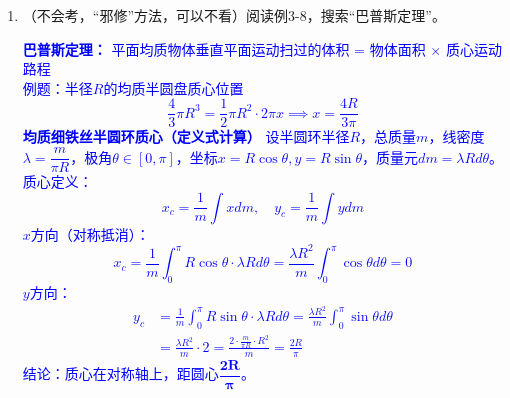 \documentclass[12pt,a4paper]{article}
\begin{document}
\begin{enumerate}[label=\arabic*.,leftmargin=*]
    \colorbox{yellow}{式3-25两端对时间微分得到质心加速度与质心外力的关系；积分得到什么？}

    \textcolor{blue}{积分会得到一维的质心坐标的式子}

    \textcolor{blue}{质心式子的推广，关键是看里面那个物理量是相对于谁而言的，有时可以得出“相对质心的质心运动速度”，即为0}
    \item （不会考，“邪修”方法，可以不看）阅读例3-8，搜索“巴普斯定理”。
    
    \textcolor{blue}{\textbf{巴普斯定理：} 平面均质物体垂直平面运动扫过的体积 = 物体面积 × 质心运动路程
\\例题：半径$R$的均质半圆盘质心位置
\[
\frac{4}{3}\pi R^3 = \frac{1}{2}\pi R^2 \cdot 2\pi x
\implies x = \frac{4R}{3\pi}
\]
\textbf{均质细铁丝半圆环质心（定义式计算）}
设半圆环半径$R$，总质量$m$，线密度$\lambda = \dfrac{m}{\pi R}$，极角$\theta\in[0,\pi]$，坐标$x=R\cos\theta,y=R\sin\theta$，质量元$dm=\lambda R d\theta$。
质心定义：
\[
x_c = \frac{1}{m}\int x dm, \quad y_c = \frac{1}{m}\int y dm
\]
$x$方向（对称抵消）：
\[
x_c = \frac{1}{m}\int_0^\pi R\cos\theta·\lambda R d\theta = \frac{\lambda R^2}{m}\int_0^\pi \cos\theta d\theta = 0
\]
$y$方向：
\begin{align*}
y_c &= \frac{1}{m}\int_0^\pi R\sin\theta·\lambda R d\theta = \frac{\lambda R^2}{m}\int_0^\pi \sin\theta d\theta \\
&= \frac{\lambda R^2}{m}·2 = \frac{2·\frac{m}{\pi R}·R^2}{m} = \frac{2R}{\pi}
\end{align*}
结论：质心在对称轴上，距圆心$\boldsymbol{\dfrac{2R}{\pi}}$。
    }


\end{enumerate}
\end{document}
